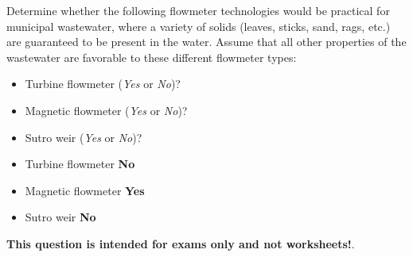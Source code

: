 

Determine whether the following flowmeter technologies would be practical for municipal wastewater, where a variety of solids (leaves, sticks, sand, rags, etc.) are guaranteed to be present in the water.  Assume that all other properties of the wastewater are favorable to these different flowmeter types:

\begin{itemize}
\item{} Turbine flowmeter ({\it Yes} or {\it No})?
\vskip 10pt
\item{} Magnetic flowmeter ({\it Yes} or {\it No})?
\vskip 10pt
\item{} Sutro weir ({\it Yes} or {\it No})?
\end{itemize}







\begin{itemize}
\item{} Turbine flowmeter {\bf No}
\item{} Magnetic flowmeter {\bf Yes}
\item{} Sutro weir {\bf No}
\end{itemize}







{\bf This question is intended for exams only and not worksheets!}.



